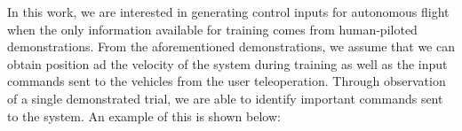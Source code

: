 \documentclass[letterpaper, 10 pt, conference]{ieeeconf}  %
\newcommand\NB[1]{$\spadesuit$\footnote{NB: #1}}
\begin{document}
In this work, we are interested in generating control inputs for autonomous flight when the only information available for training comes from human-piloted demonstrations. From the aforementioned demonstrations, we assume that we can obtain position ad the velocity of the system during training as well as the input commands sent to the vehicles from the user teleoperation.
Through observation of a single demonstrated trial, we are able to identify important commands sent to the system. An example of this is shown below:
\end{document}
